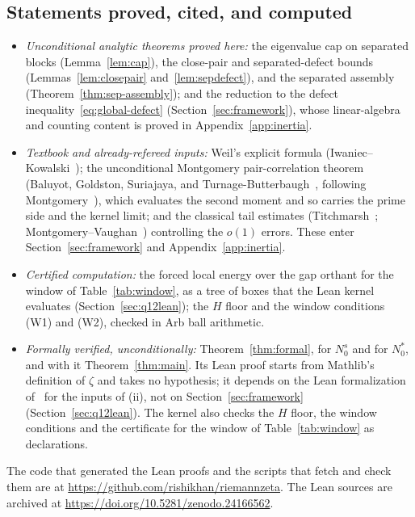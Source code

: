 \documentclass[11pt]{article}
\theoremstyle{definition}
\begin{document}
\subsection{Statements proved, cited, and computed}\label{sec:claims}
\begin{itemize}
\item[(i)] \emph{Unconditional analytic theorems proved here:} the eigenvalue
cap on separated blocks (Lemma~\ref{lem:cap}), the close-pair and
separated-defect bounds (Lemmas~\ref{lem:closepair} and~\ref{lem:sepdefect}),
and the separated assembly (Theorem~\ref{thm:sep-assembly}); and the reduction to the
defect inequality~\eqref{eq:global-defect} (Section~\ref{sec:framework}), whose
linear-algebra and counting content is proved in Appendix~\ref{app:inertia}.
\item[(ii)] \emph{Textbook and already-refereed inputs:} Weil's explicit formula
(Iwaniec--Kowalski~\cite[Theorem~5.11]{IK04}); the unconditional Montgomery pair-correlation
theorem (Baluyot, Goldston, Suriajaya, and
Turnage-Butterbaugh~\cite{BGSTB24}, following Montgomery~\cite{Mon73,Mon75}), which
evaluates the second moment and so carries the prime side and the kernel limit;
and the classical tail estimates
(Titchmarsh~\cite{Tit86}; Montgomery--Vaughan~\cite{MV07}) controlling the $o(1)$
errors. These enter Section~\ref{sec:framework} and Appendix~\ref{app:inertia}.
\item[(iii)] \emph{Certified computation:} the forced local energy over the
gap orthant for the window of Table~\ref{tab:window}, as a tree of boxes that
the Lean kernel evaluates (Section~\ref{sec:q12lean}); the $H$ floor and the
window conditions (W1) and (W2), checked in Arb ball arithmetic.
\item[(iv)] \emph{Formally verified, unconditionally:} Theorem~\ref{thm:formal},
for $N_0^s$ and for $N_0^*$, and with it Theorem~\ref{thm:main}. Its Lean
proof starts from Mathlib's definition of $\zeta$ and takes no hypothesis; it
depends on the Lean formalization~\cite{Zeta23Lean} of~\cite{AF26} for the
inputs of (ii), not on Section~\ref{sec:framework}
(Section~\ref{sec:q12lean}). The kernel also checks the $H$ floor, the window
conditions and the certificate for the window of Table~\ref{tab:window} as
declarations.
\end{itemize}

The code that generated the Lean proofs and the scripts that fetch and check
them are at \url{https://github.com/rishikhan/riemannzeta}. The Lean sources
are archived at \url{https://doi.org/10.5281/zenodo.24166562}.
\end{document}
